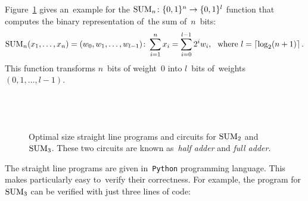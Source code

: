 Figure~\ref{figure:sum23} gives an~example for
the 
$\operatorname{SUM}_n \colon \{0,1\}^n \to \{0,1\}^l$ function 
that computes the binary representation of~the sum of~$n$~bits:
\[\operatorname{SUM}_n(x_1, \dotsc, x_n)=(w_0, w_1, \dotsc, w_{l-1})\colon \sum_{i=1}^{n}x_i=\sum_{i=0}^{l-1}2^iw_i \text{, \, where } l=\lceil \log_2(n+1)\rceil \, .\]
This function transforms $n$~bits 
of weight~0 into $l$~bits 
of~weights $(0,1,\dotsc,l-1)$.
%
\begin{figure}[t]
\begin{minipage}{.28\textwidth}
\inputminted[firstline=15,lastline=18]{python}{../tutorial.py}
\end{minipage}
\begin{minipage}{.18\textwidth}
\end{minipage}
\begin{minipage}{.33\textwidth}
\inputminted[firstline=22,lastline=28]{python}{../tutorial.py}
\end{minipage}
\begin{minipage}{.18\textwidth}
~
\end{minipage}
\caption{Optimal size straight line programs and circuits for $\operatorname{SUM}_2$ and $\operatorname{SUM}_3$. These two circuits are known as~\emph{half adder} and \emph{full adder}.}
\label{figure:sum23}
\end{figure}
%
The straight line
programs are given
in~\texttt{Python} programming language.
This makes particularly easy to~verify their correctness.
For example, the program for $\operatorname{SUM}_3$ can be verified
with just three lines of code:
\inputminted[firstline=32,lastline=36]{python}{../tutorial.py}

